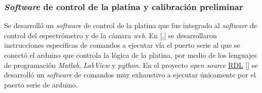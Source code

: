 \begin{figure}[H]
\begin{floatrow}
	\end{floatrow}
\end{figure}


\singlespacing
\subsubsection{\textit{Software} de control de la platina \href{https://github.com/jrr1984/open\_frame\_XYStage}{\faGithub}  y calibración preliminar}
\label{sec:softcalib}

\hspace{0.5cm}Se desarrolló un \textit{software} de control de la platina que fue integrado al \textit{software} de control del espectrómetro y de la cámara \textit{web}. En [\cite{campbells},\href{https://github.com/raacampbell/openstage/tree/master/serialInterfaceScripts}{\faGithub}] se desarrollaron instrucciones específicas de comandos a ejecutar vía el puerto serie al que se conectó el arduino que controla la lógica de la platina, por medio de los lenguajes de programación \textit{Matlab}, \textit{LabView} y \textit{python}. En el proyecto \textit{open source} \href{https://www.youtube.com/watch?v=Lm8oprDhAnQ}{RDL} [\href{https://forum.arduino.cc/index.php?topic=469343}{\faCode}] se desarrolló un \textit{software} de comandos muy exhaustivo a ejecutar únicamente por el puerto serie de arduino.

